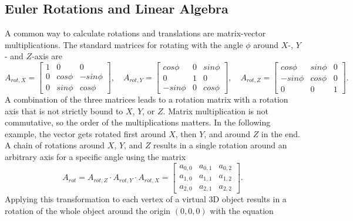 \subsection{Euler Rotations and Linear Algebra}
A common way to calculate rotations and translations are matrix-vector multiplications. The standard matrices for rotating with the angle $\phi$ around $X$-, $Y$- and $Z$-axis are 
\begin{equation*}
    A_{rot,X} =
    \begin{bmatrix}
        1 & 0        & 0         \\
        0 & cos \phi & -sin \phi \\
        0 & sin \phi & cos \phi
    \end{bmatrix}
    ,\quad
    A_{rot,Y} =
    \begin{bmatrix}
        cos \phi  & 0 & sin \phi \\
        0         & 1 & 0        \\
        -sin \phi & 0 & cos \phi
    \end{bmatrix}
    ,\quad
    A_{rot,Z} =
    \begin{bmatrix}
        cos \phi  & sin \phi & 0 \\
        -sin \phi & cos \phi & 0 \\
        0         & 0        & 1
    \end{bmatrix}.
\end{equation*}
A combination of the three matrices leads to a rotation matrix with a rotation axis that is not strictly bound to $X$, $Y$, or $Z$. Matrix multiplication is not commutative, so the order of the multiplications matters. In the following example, the vector gets rotated first around $X$, then $Y$, and around $Z$ in the end. A chain of rotations around $X$,  $Y$, and $Z$ results in a single rotation around an arbitrary axis for a specific angle using the matrix
\begin{equation*}
    A_{rot}
    =A_{rot,Z} \cdot A_{rot,Y} \cdot A_{rot,X}  =
    \begin{bmatrix}
        a_{0,0} & a_{0,1} & a_{0,2} \\
        a_{1,0} & a_{1,1} & a_{1,2} \\
        a_{2,0} & a_{2,1} & a_{2,2}
    \end{bmatrix}.
\end{equation*}
 Applying this transformation to each vertex of a virtual 3D object results in a rotation of the whole object around the origin $(0,0,0)$ with the equation\\
